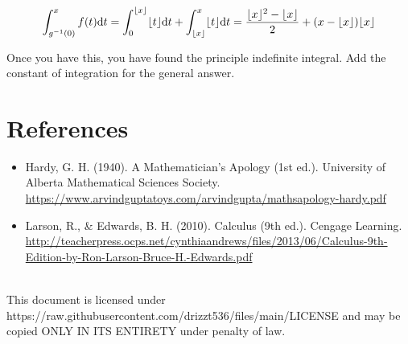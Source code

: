 \documentclass[12pt]{article}
\begin{document}
		\begin{align*}
			\int_{g^{-1}(0)}^xf(t)\text dt
			= \int_0^{\lfloor x\rfloor}\lfloor t\rfloor\text dt+\int_{\lfloor x\rfloor}^x\lfloor t\rfloor\text dt
			= \frac{\lfloor x\rfloor^2-\lfloor x\rfloor}2+(x-\lfloor x\rfloor)\lfloor x\rfloor
		\end{align*}

		Once you have this, you have found the principle indefinite integral. Add the constant of integration
		for the general answer.


\section*{References}
	\begin{itemize}
		\item Hardy, G. H. (1940). A Mathematician's Apology (1st ed.). University of Alberta Mathematical Sciences Society.\\
			\url{https://www.arvindguptatoys.com/arvindgupta/mathsapology-hardy.pdf}\\

		\item Larson, R., & Edwards, B. H. (2010). Calculus (9th ed.). Cengage Learning.\\
			\url{http://teacherpress.ocps.net/cynthiaandrews/files/2013/06/Calculus-9th-Edition-by-Ron-Larson-Bruce-H.-Edwards.pdf}
	\end{itemize}
	\vspace{28em}\\
	This document is licensed under https://raw.githubusercontent.com/drizzt536/files/main/LICENSE
	and may be copied ONLY IN ITS ENTIRETY under penalty of law.
\end{document}
